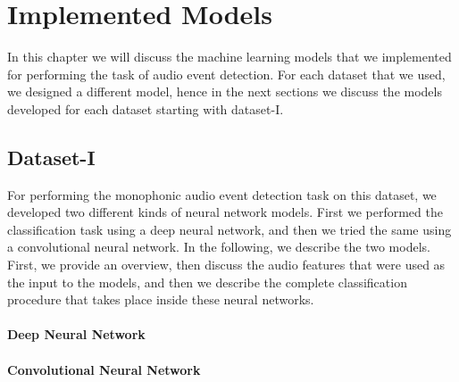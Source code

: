 \chapter{Implemented Models}
In this chapter we will discuss the machine learning models that we implemented for performing the task of audio event detection. For each dataset that we used, we designed a different model, hence in the next sections we discuss the models developed for each dataset starting with dataset-I.

\section{Dataset-I}

For performing the monophonic audio event detection task on this dataset, we developed two different kinds of neural network models. First we performed the classification task using a deep neural network, and then we tried the same using a convolutional neural network. In the following, we describe the two models. First, we provide an overview, then discuss the audio features that were used as the input to the models, and then we describe the complete classification procedure that takes place inside these neural networks.

\subsubsection{Deep Neural Network}



\subsubsection{Convolutional Neural Network}
